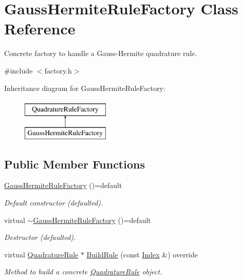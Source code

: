 \hypertarget{classGaussHermiteRuleFactory}{\section{Gauss\-Hermite\-Rule\-Factory Class Reference}
\label{classGaussHermiteRuleFactory}
}


Concrete factory to handle a Gauss-\/\-Hermite quadrature rule.  




{\ttfamily \#include $<$factory.\-h$>$}

Inheritance diagram for Gauss\-Hermite\-Rule\-Factory\-:\begin{figure}[H]
\begin{center}
\leavevmode
\includegraphics[height=2.000000cm]{classGaussHermiteRuleFactory}
\end{center}
\end{figure}
\subsection*{Public Member Functions}
\begin{DoxyCompactItemize}
\item 
\hypertarget{classGaussHermiteRuleFactory_a192b5732878d8393276226a4f359f1cd}{\hyperlink{classGaussHermiteRuleFactory_a192b5732878d8393276226a4f359f1cd}{Gauss\-Hermite\-Rule\-Factory} ()=default}\label{classGaussHermiteRuleFactory_a192b5732878d8393276226a4f359f1cd}

\begin{DoxyCompactList}\small\item\em Default constructor (defaulted). \end{DoxyCompactList}\item 
\hypertarget{classGaussHermiteRuleFactory_ae01722716cbf1c2d540f8d8079208b92}{virtual \hyperlink{classGaussHermiteRuleFactory_ae01722716cbf1c2d540f8d8079208b92}{$\sim$\-Gauss\-Hermite\-Rule\-Factory} ()=default}\label{classGaussHermiteRuleFactory_ae01722716cbf1c2d540f8d8079208b92}

\begin{DoxyCompactList}\small\item\em Destructor (defaulted). \end{DoxyCompactList}\item 
virtual \hyperlink{classQuadratureRule}{Quadrature\-Rule} $\ast$ \hyperlink{classGaussHermiteRuleFactory_a1e907a5209041516fa18c86c79fb1ec6}{Build\-Rule} (const \hyperlink{typedefs_8h_a2c726f8f32697958e9d6c2afecda531d}{Index} \&) override
\begin{DoxyCompactList}\small\item\em Method to build a concrete \hyperlink{classQuadratureRule}{Quadrature\-Rule} object. \end{DoxyCompactList}\end{DoxyCompactItemize}


